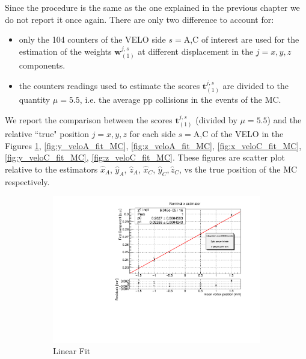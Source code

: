 Since the procedure is the same as the one explained in the previous chapter we do not report it once again. There are only two difference to account for:
\begin{itemize}
    \item only the 104 counters of the VELO side $s=$A,C of interest are used for the estimation of the weights $\mathbf{w}^{j,s}_{(1)}$ at different displacement in the $j=x,y,z$ components.
    \item the counters readings used to estimate the scores $\mathbf{t}^{j,s}_{(1)}$ are divided to the quantity $\mu=5.5$, i.e. the average pp collisions in the events of the MC.
\end{itemize}
We report the comparison between the scores $\mathbf{t}^{j,s}_{(1)}$ (divided by $\mu=5.5$) and the relative ``true" position $j=x,y,z$ for each side $s=$A,C of the VELO in the Figures \ref{fig:x_veloA_fit_MC}, \ref{fig:y_veloA_fit_MC}, \ref{fig:z_veloA_fit_MC}, \ref{fig:x_veloC_fit_MC}, \ref{fig:y_veloC_fit_MC}, \ref{fig:z_veloC_fit_MC}. These figures are scatter plot relative to the estimators $\hat{x}_A$, $\hat{y}_A$, $\hat{z}_A$, $\hat{x}_C$, $\hat{y}_C$$, \hat{z}_C$,  vs the true position of the MC respectively.
\begin{figure}
    \centering
    \begin{subfigure}{0.48\textwidth}
    \includegraphics[width=\linewidth]{figures/x_fit_veloA_MC_normalized.pdf}
    \caption{Linear Fit}\label{fig:x_veloA_fit_MC}
    \end{subfigure}
    \begin{subfigure}{0.48\textwidth}

\end{subfigure}
\end{figure}$$
